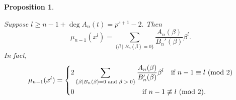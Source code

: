 \documentclass[11 pt]{amsart}
\theoremstyle{plain}
\newtheorem{prop}[thm]{Proposition}
\theoremstyle{definition}
\theoremstyle{remark}
\def\b{\beta}
\def\m{\mu}
\begin{document}
\begin{prop} \label{m_ninbeta}

        Suppose $l \ge n-1+ \deg A_n(t)=
        p^{s+1}-2.$ Then $$\m_{n-1}(x^l)=\sum_{\{\b \mid B_n(\b)=0\}}\frac{A_n(\b)}{B_n'(\b)}\b^l.$$ In fact, 
        \begin{equation*}
        \m_{n-1}(x^l)=\begin{dcases}
            2 \sum_{\{\b \mid B_n(\b)=0 \text{ and $\b>0$}\}}\frac{A_n(\b)}{B_n'(\b)}\b^l \quad \text{if $n-1  \equiv l$ (mod $2$)}\\
            0\qquad \qquad \qquad \qquad \quad \ \   \text{if $n-1 \not \equiv l$ (mod $2$)}.
        \end{dcases}
    \end{equation*}
 
\end{prop}
\end{document}
